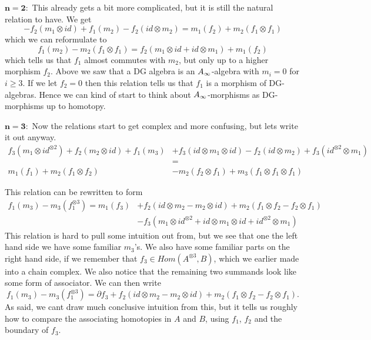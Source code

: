 $\mathbf{n=2 :}$ This already gets a bit more complicated, but it is still the natural relation to have. We get
\begin{equation*}
    -f_2(m_1\otimes id)+f_1(m_2)-f_2(id\otimes m_2) = m_1(f_2)+m_2(f_1\otimes f_1)
\end{equation*}
which we can reformulate to 
\begin{equation*}
    f_1(m_2)-m_2(f_1\otimes f_1) = f_2(m_1\otimes id + id\otimes m_1) + m_1(f_2)
\end{equation*}
which tells us that $f_1$ almost commutes with $m_2$, but only up to a higher morphism $f_2$. Above we saw that a DG algebra is an $A_{\infty}$-algebra with $m_i=0$ for $i\geq 3$. If we let $f_2=0$ then this relation tells us that $f_1$ is a morphism of DG-algebras. Hence we can kind of start to think about $A_{\infty}$-morphisms as DG-morphisms up to homotopy.  

$\mathbf{n=3 :}$ Now the relations start to get complex and more confusing, but lets write it out anyway. 
\begin{align*}
    f_3(m_1\otimes id^{\otimes 2})
    +f_2(m_2\otimes id)
    +f_1(m_3)
    &+f_3(id\otimes m_1\otimes id)
    -f_2(id\otimes m_2)
    +f_3(id^{\otimes 2}\otimes m_1) \\
    &= \\
    m_1(f_1)
    +m_2(f_1\otimes f_2) 
    &-m_2(f_2\otimes f_1)
    +m_3(f_1\otimes f_1\otimes f_1)
\end{align*}

This relation can be rewritten to form 
\begin{align*}
    f_1(m_3)
    -m_3(f_1^{\otimes 3})
    = 
    m_1(f_3)
    &+f_2(id\otimes m_2-m_2\otimes id)
    +m_2(f_1\otimes f_2 - f_2\otimes f_1) \\
    &-f_3(m_1\otimes id^{\otimes 2}+id\otimes m_1\otimes id+id^{\otimes 2}\otimes m_1)
\end{align*}
This relation is hard to pull some intuition out from, but we see that one the left hand side we have some familiar $m_3$'s. We also have some familiar parts on the right hand side, if we remember that $f_3\in Hom(A^{\otimes 3}, B)$, which we earlier made into a chain complex. We also notice that the remaining two summands look like some form of associator. We can then write
\begin{equation*}
    f_1(m_3)-m_3(f_1^{\otimes 3}) = \partial f_3 + f_2(id\otimes m_2-m_2\otimes id)
    +m_2(f_1\otimes f_2 - f_2\otimes f_1).
\end{equation*}
As said, we cant draw much conclusive intuition from this, but it tells us roughly how to compare the associating homotopies in $A$ and $B$, using $f_1$, $f_2$ and the boundary of $f_3$.  

